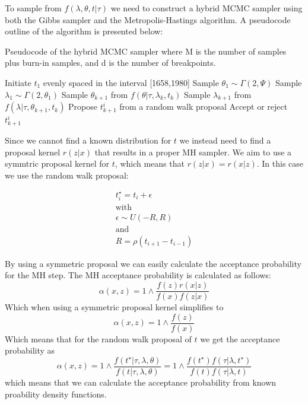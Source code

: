 \documentclass[a4paper]{article}
\begin{document}
To sample from $f(\lambda, \theta, t | \tau)$ we need to construct a hybrid MCMC sampler using both the Gibbs sampler and the Metropolis-Hastings algorithm. A pseudocode outline of the algorithm is presented below:

\begin{algorithm}
    \caption{Pseudocode of the hybrid MCMC sampler where M is the number of samples plus burn-in samples, and d is the number of breakpoints.}
    \begin{algorithmic}
        \State Initiate $t_1$ evenly spaced in the interval [1658,1980]
        \State Sample $\theta_1 \sim \Gamma(2,\Psi)$
        \State Sample $\lambda_1 \sim \Gamma(2,\theta_1)$
        \State Sample $\theta_{k+1}$ from $f(\theta|\tau, \lambda_k, t_k)$
        \State Sample $\lambda_{k+1}$ from $f(\lambda|\tau, \theta_{k+1}, t_k)$
        \State Propose $t_{k+1}^i$ from a random walk proposal
        \State Accept or reject $t_{k+1}^i$
        \EndFor
        \EndFor
    \end{algorithmic}
\end{algorithm}

Since we cannot find a known distribution for $t$ we instead need to find a proposal kernel $r(z|x)$ that results in a proper MH sampler. We aim to use a symmtric proposal kernel for $t$, which means that $r(z|x) = r(x|z)$. In this case we use the random walk proposal:

\begin{equation}
    \label{eq:proposal_kernel}
    \begin{gathered}
        t_i^\star = t_i + \epsilon \\
        \text{with} \\
        \epsilon \sim U(-R,R) \\
        \text{and} \\
        R = \rho(t_{i+1}-t_{i-1})
    \end{gathered}
\end{equation}

By using a symmetric proposal we can easily calculate the acceptance probability for the MH step. The MH acceptance probability is calculated as follows:
\begin{equation}
    \alpha(x,z) = 1 \wedge \frac{f(z)r(x|z)}{f(x)f(z|x)}
\end{equation}
Which when using a symmetric proposal kernel simplifies to
\begin{equation}
    \alpha(x,z) = 1 \wedge \frac{f(z)}{f(x)}
\end{equation}
Which means that for the random walk proposal of $t$ we get the acceptance probability as
\begin{equation}
    \alpha(x,z) = 1 \wedge \frac{f(t^\star | \tau, \lambda, \theta)}{f(t | \tau, \lambda, \theta)} = 1 \wedge \frac{f(t^\star)f(\tau|\lambda,t^\star)}{f(t)f(\tau|\lambda,t)}
\end{equation}
which means that we can calculate the acceptance probability from known proability density functions.
\end{document}
